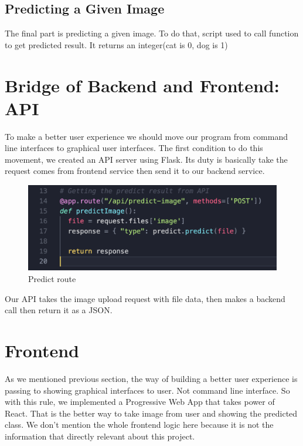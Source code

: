 \documentclass[onecolumn]{article}
\begin{document}
\subsection{Predicting a Given Image}
The final part is predicting a given image. To do that,  script used to call  function to get predicted result. It returns an integer(cat is 0, dog is 1)

\section{Bridge of Backend and Frontend: API}
To make a better user experience we should move our program from command line interfaces to graphical user interfaces. The first condition to do this movement, we created an API server using Flask. Its duty is basically take the request comes from frontend service then send it to our backend service.

\begin{figure}[H]
\centering
\includegraphics[scale=0.30]{api.png}
\caption{Predict route}
\end{figure}

Our API takes the image upload request with file data, then makes a backend call then return it as a JSON.

\section{Frontend}
As we mentioned previous section, the way of building a better user experience is passing to showing graphical interfaces to user. Not command line interface. So with this rule, we implemented a Progressive Web App that takes power of React. That is the better way to take image from user and showing the predicted class. We don't mention the whole frontend logic here because it is not the information that directly relevant about this project.
\end{document}
